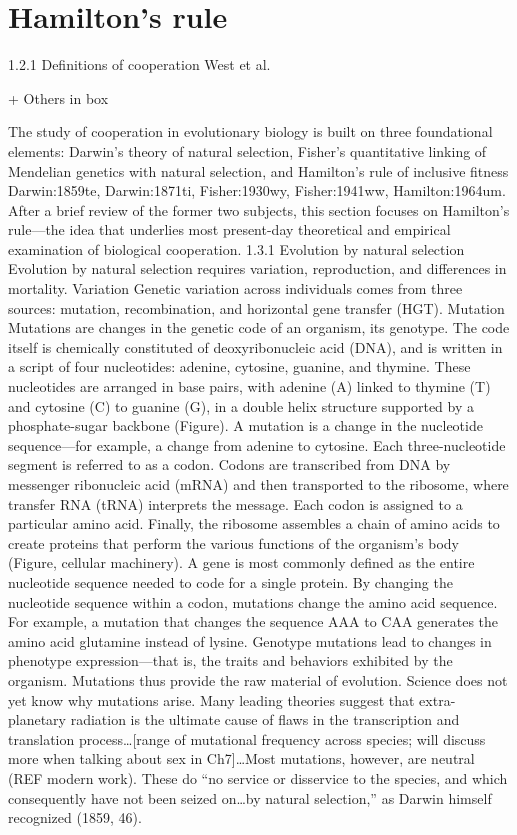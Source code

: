 \documentclass{tufte-book} %
\begin{document}
\section{Hamilton's rule}

1.2.1 Definitions of cooperation
West et al. 

+ Others in box

The study of cooperation in evolutionary biology is built on three foundational elements: Darwin’s theory of natural selection, Fisher’s quantitative linking of Mendelian genetics with natural selection, and Hamilton’s rule of inclusive fitness {Darwin:1859te, Darwin:1871ti, Fisher:1930wy, Fisher:1941ww, Hamilton:1964um}. After a brief review of the former two subjects, this section focuses on Hamilton’s rule—the idea that underlies most present-day theoretical and empirical examination of biological cooperation. 
	1.3.1	Evolution by natural selection
Evolution by natural selection requires variation, reproduction, and differences in mortality.
Variation
Genetic variation across individuals comes from three sources: mutation, recombination, and horizontal gene transfer (HGT).
Mutation
Mutations are changes in the genetic code of an organism, its genotype. The code itself is chemically constituted of deoxyribonucleic acid (DNA), and is written in a script of four nucleotides: adenine, cytosine, guanine, and thymine. These nucleotides are arranged in base pairs, with adenine (A) linked to thymine (T) and cytosine (C) to guanine (G), in a double helix structure supported by a phosphate-sugar backbone (Figure). A mutation is a change in the nucleotide sequence—for example, a change from adenine to cytosine. Each three-nucleotide segment is referred to as a codon. Codons are transcribed from DNA by messenger ribonucleic acid (mRNA) and then transported to the ribosome, where transfer RNA (tRNA) interprets the message. Each codon is assigned to a particular amino acid.  Finally, the ribosome assembles a chain of amino acids to create proteins that perform the various functions of the organism’s body (Figure, cellular machinery). A gene is most commonly defined as the entire nucleotide sequence needed to code for a single protein. By changing the nucleotide sequence within a codon, mutations change the amino acid sequence. For example, a mutation that changes the sequence AAA to CAA generates the amino acid glutamine instead of lysine. Genotype mutations lead to changes in phenotype expression—that is, the traits and behaviors exhibited by the organism. 
Mutations thus provide the raw material of evolution. Science does not yet know why mutations arise. Many leading theories suggest that extra-planetary radiation is the ultimate cause of flaws in the transcription and translation process…[range of mutational frequency across species; will discuss more when talking about sex in Ch7]…Most mutations, however, are neutral (REF modern work). These do “no service or disservice to the species, and which consequently have not been seized on…by natural selection,” as Darwin himself recognized (1859, 46). 
\end{document}
